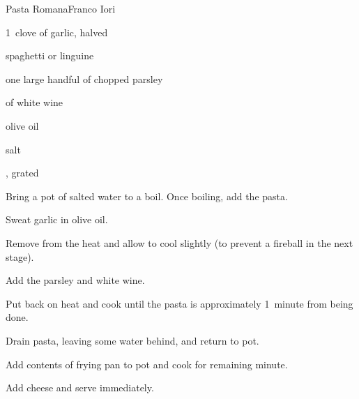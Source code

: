 \begin{recipe}{Pasta Romana}{Franco Iori}{}

\begin{ingredients}
\item 1~clove of garlic, halved
\item {} spaghetti or linguine
\item one large handful of chopped parsley
\item \C{\half} of white wine
\item olive oil
\item salt
\item {}, grated
\end{ingredients}

\begin{directions}
\item Bring a pot of salted water to a boil. Once boiling, add the pasta.
\item Sweat garlic in olive oil.
\item Remove from the heat and allow to cool slightly (to prevent a fireball in the next stage).
\item Add the parsley and white wine.
\item Put back on heat and cook until the pasta is approximately 1~minute from being done.
\item Drain pasta, leaving some water behind, and return to pot.
\item Add contents of frying pan to pot and cook for remaining minute.
\item Add cheese and serve immediately.
\end{directions}

\end{recipe}
